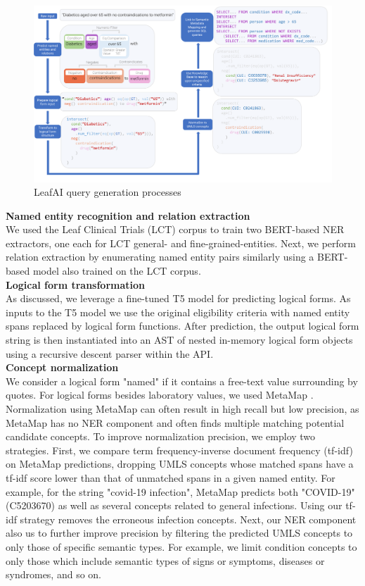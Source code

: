 \documentclass[../main.tex]{subfiles}
\begin{document}
\begin{figure}[h]
  \includegraphics[scale=0.52]{Figures/Aim2/aim2_leafai_flow.pdf}  
\caption{LeafAI query generation processes}
\label{aim2_fig_leafai_querygen}
\end{figure}

\noindent \textbf{Named entity recognition and relation extraction} \\
We used the Leaf Clinical Trials (LCT) corpus \cite{dobbins2022leaf} to train two BERT-based \cite{devlin2018bert} NER extractors, one each for LCT general- and fine-grained-entities. Next, we perform relation extraction by enumerating named entity pairs similarly using a BERT-based model also trained on the LCT corpus. \\

\noindent \textbf{Logical form transformation} \\
As discussed, we leverage a fine-tuned T5 model for predicting logical forms. As inputs to the T5 model we use the original eligibility criteria with named entity spans replaced by logical form functions. After prediction, the output logical form string is then instantiated into an AST of nested in-memory logical form objects using a recursive descent parser within the API. \\

\noindent \textbf{Concept normalization} \\
We consider a logical form "named" if it contains a free-text value surrounding by quotes. For logical forms besides laboratory values, we used MetaMap \cite{aronson2001effective}. Normalization using MetaMap can often result in high recall but low precision, as MetaMap has no NER component and often finds multiple matching potential candidate concepts. To improve normalization precision, we employ two strategies. First, we compare term frequency-inverse document frequency (tf-idf) on MetaMap predictions, dropping UMLS concepts whose matched spans have a tf-idf score lower than that of unmatched spans in a given named entity. For example, for the string "covid-19 infection", MetaMap predicts both "COVID-19" (C5203670) as well as several concepts related to general infections. Using our tf-idf strategy removes the erroneous infection concepts. Next, our NER component also us to further improve precision by filtering the predicted UMLS concepts to only those of specific semantic types. For example, we limit condition concepts to only those which include semantic types of signs or symptoms, diseases or syndromes, and so on. 
\end{document}
